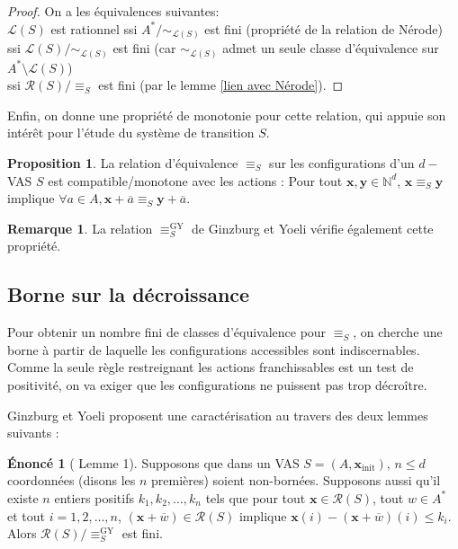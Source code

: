 \documentclass[a4paper,final]{article}
\theoremstyle{definition}
\newtheorem{Proposition}[Theorem]{Proposition}
\newtheorem*{Remark}{Remarque}
\newtheorem*{Statement}{Énoncé}
\let\leq\leqslant
\newcommand{\N}{\ensuremath{\mathbb{N}}}
\newcommand{\lang}{\ensuremath{\mathcal{L}}}
\newcommand{\conf}{\ensuremath{\mathcal{R}}}
\newcommand{\vect}[1]{\ensuremath{\mathbf{#1}}}
\newcommand{\rel}{\ensuremath{\equiv}}
\newcommand{\relGY}{\ensuremath{\equiv^\text{GY}_S}}
\newcommand{\xinit}{\ensuremath{\vect{x}_\text{init}}}
\newcommand{\valeur}[1]{\ensuremath{\overline{#1}}}
\begin{document}
\begin{proof}
On a les équivalences suivantes: \\
$\lang(S)$ est rationnel 
ssi $A^\ast/\sim_{\lang(S)}$ est fini (propriété de la relation de Nérode) \\
ssi $\lang(S)/\sim_{\lang(S)}$ est fini (car $\sim_{\lang(S)}$ admet un seule classe d'équivalence sur $A^\ast \setminus \lang(S)$) \\
ssi $\conf(S)/\rel_S$ est fini (par le lemme \ref{lien avec Nérode}).
\end{proof}

Enfin, on donne une propriété de monotonie pour cette relation, qui appuie son intérêt pour l'étude du système de transition $S$.

\begin{Proposition}\label{Monotonie relation}
La relation d'équivalence $\rel_S$ sur les configurations d'un $d-$VAS $S$ est compatible/monotone avec les actions :
Pour tout $\vect{x},\vect{y} \in\N^d$, $\vect{x}\rel_S \vect{y}$ implique $\forall a\in A, \vect{x} +\valeur{a} \rel_S \vect{y} +\valeur{a}$.
\end{Proposition}

\begin{Remark}
La relation $\relGY$ de Ginzburg et Yoeli vérifie également cette propriété.
\end{Remark}


\subsection{Borne sur la décroissance}

Pour obtenir un nombre fini de classes d'équivalence pour $\rel_S$, on cherche une borne à partir de laquelle les configurations accessibles sont indiscernables.
Comme la seule règle restreignant les actions franchissables est un test de positivité, on va exiger que les configurations ne puissent pas trop décroître.

Ginzburg et Yoeli proposent une caractérisation au travers des deux lemmes suivants :


\begin{Statement}[\cite{giyo80} Lemme 1]
    Supposons que dans un VAS $S=(A,\xinit)$, $n\leq d$ coordonnées (disons les $n$ premières) soient non-bornées.
    Supposons aussi qu'il existe $n$ entiers positifs $k_1,k_2,\dots,k_n$ tels que pour tout $\vect{x}\in\conf(S)$, tout $w\in A^\ast$ et tout $i=1,2,\dots,n$, 
    $(\vect{x} +\valeur{w})\in\conf(S)$ implique
    $\vect{x}(i) - (\vect{x} +\valeur{w})(i) \leq k_i$.
    Alors $\conf(S)/\relGY$ est fini.
\end{Statement}
\end{document}
